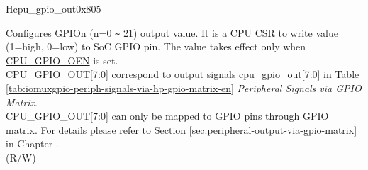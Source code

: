 \begin{register}{H}{cpu\_gpio\_out}{0x805}\label{regdesc:GPIO_OUT}
%
%
%
%
%
%
%
%
%
\regnewline%
\begin{regdesc}\begin{reglist}
\label{fielddesc:GPIO_OUT}\item [CPU\_GPIO\_OUT] Configures GPIOn (n=0 \verb+~+ 21) output value. It is a CPU CSR to write value (1=high, 0=low) to SoC GPIO pin. The value takes effect only when \hyperref[fielddesc:GPIO_OEN]{CPU\_GPIO\_OEN} is set.\\
CPU\_GPIO\_OUT[7:0] correspond to output signals cpu\_gpio\_out[7:0] in Table \ref{tab:iomuxgpio-periph-signals-via-hp-gpio-matrix-en} \textit{Peripheral Signals via GPIO Matrix}. \\
CPU\_GPIO\_OUT[7:0] can only be mapped to GPIO pins through GPIO matrix. For details please refer to Section \ref{sec:peripheral-output-via-gpio-matrix} in Chapter \textit{}.\\
(R/W)
\end{reglist}\end{regdesc}
\end{register}
